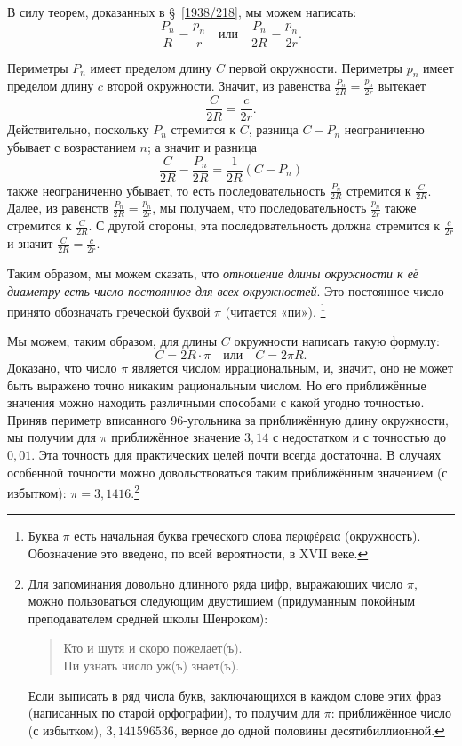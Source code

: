 \documentclass[twoside]{book}
\begin{document}
В силу теорем, доказанных в §~\ref{1938/218}, мы можем написать:
\[\frac{P_n}{R}=\frac{p_n}{r}
\quad\text{или}\quad
\frac{P_n}{2R}=\frac{p_n}{2r}.\]

Периметры $P_n$ имеет пределом длину $C$ первой окружности.
Периметры $p_n$ имеет пределом длину $c$ второй окружности.
Значит, из равенства $\frac{P_n}{2R}=\frac{p_n}{2r}$ вытекает
\[\frac{C}{2R}=\frac{c}{2r}.\]
Действительно, поскольку $P_n$ стремится к $C$,
разница $C-P_n$ неограниченно убывает с возрастанием $n$;
а значит и разница
\[\frac{C}{2R}-\frac{P_n}{2R}=\frac{1}{2R}(C-P_n)\]
также неограниченно убывает, то есть последовательность $\frac{P_n}{2R}$ стремится к $\frac{C}{2R}$.
Далее, из равенств $\frac{P_n}{2R}=\frac{p_n}{2r}$,
мы получаем, что последовательность $\frac{p_n}{2r}$ также стремится к $\frac{C}{2R}$.
С другой стороны, эта последовательность должна стремится к $\frac{c}{2r}$ и значит $\frac{C}{2R}=\frac{c}{2r}$.

Таким образом, мы можем сказать, что \emph{отношение длины окружности к её диаметру есть число постоянное для всех окружностей}. 
Это постоянное число принято обозначать греческой буквой $\pi$ (читается «пи»).%
\footnote{Буква $\pi$ есть начальная буква греческого слова \textgreek{περιφέρεια} (окружность).
Обозначение это введено, по всей вероятности, в XVII веке.
}

Мы можем, таким образом, для длины $C$ окружности написать такую формулу:
\[C=2R\cdot\pi
\quad\text{или}\quad
C=2\pi R.
\]
Доказано, что число $\pi$ является числом иррациональным, и, значит, оно не может быть выражено точно никаким рациональным числом.
Но его приближённые значения можно находить различными способами с какой угодно точностью.
Приняв периметр вписанного 96-угольника за приближённую длину окружности, мы получим для $\pi$ приближённое значение $3{,}14$ с недостатком и с точностью до $0{,}01$.
Эта точность для практических целей почти всегда достаточна.
В случаях особенной точности можно довольствоваться таким приближённым значением (с избытком):
$\pi = 3{,}1416$.\footnote{Для запоминания довольно длинного ряда цифр, выражающих число $\pi$, можно пользоваться следующим  двустишием (придуманным покойным преподавателем средней школы Шенроком):
\begin{verse}
Кто и шутя и скоро пожелает(ъ).\\
Пи узнать число уж(ъ) знает(ъ).
\end{verse}
Если выписать в ряд числа букв, заключающихся в каждом слове этих фраз (написанных по старой орфографии), то получим для $\pi$:
приближённое число (с избытком), $3{,}141596536$, верное до одной половины десятибиллионной.}%
\end{document}

